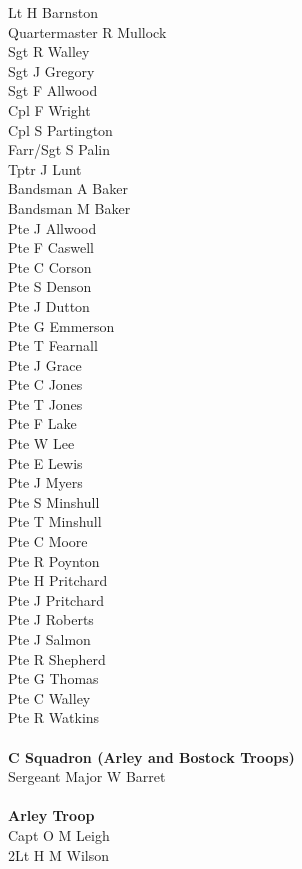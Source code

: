 \begin{multicols}{2}
  Lt H Barnston \\
  Quartermaster R Mullock \\
  Sgt R Walley \\
  Sgt J Gregory \\
  Sgt F Allwood \\
  Cpl F Wright \\
  Cpl S Partington \\
  Farr/Sgt S Palin \\
  Tptr J Lunt \\
  Bandsman A Baker \\
  Bandsman M Baker \\
  Pte J Allwood \\
  Pte F Caswell \\
  Pte C Corson \\
  Pte S Denson \\
  Pte J Dutton \\
  Pte G Emmerson \\
  Pte T Fearnall \\
  Pte J Grace \\
  Pte C Jones \\
  Pte T Jones \\
  Pte F Lake \\
  Pte W Lee \\
  Pte E Lewis \\
  Pte J Myers \\
  Pte S Minshull \\
  Pte T Minshull \\
  Pte C Moore \\
  Pte R Poynton \\
  Pte H Pritchard \\
  Pte J Pritchard \\
  Pte J Roberts \\
  Pte J Salmon \\
  Pte R Shepherd \\
  Pte G Thomas \\
  Pte C Walley \\
  Pte R Watkins \\
  \\
  \textbf{C Squadron (Arley and Bostock Troops)} \\
  Sergeant Major W Barret \\
  \\
  \textbf{Arley Troop} \\
  Capt O M Leigh \\
  2Lt H M Wilson \\

\end{multicols}
